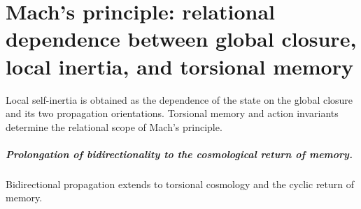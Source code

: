\chapter{Mach's principle: relational dependence between global closure, local inertia, and torsional memory}
\label{chap:parte-iv-70}

Local self-inertia is obtained as the dependence of the state on the global closure and its two propagation orientations. Torsional memory and action invariants determine the relational scope of Mach's principle.



\paragraph{Prolongation of bidirectionality to the cosmological return of memory.} Bidirectional propagation extends to torsional cosmology and the cyclic return of memory.
